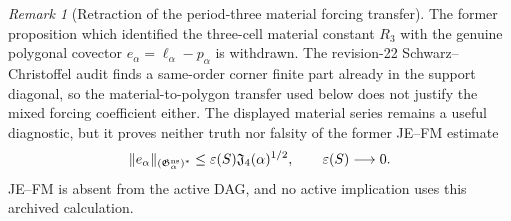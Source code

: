 \documentclass[11pt]{amsart}
\numberwithin{equation}{section}
\theoremstyle{definition}
\theoremstyle{remark}
\newtheorem{remark}[theorem]{Remark}
\newcommand{\Jfour}{\mathfrak J_4}
\begin{document}
\begin{remark}[Retraction of the period-three material forcing transfer]
\label{JP:rem:period-three-material-forcing}
The former proposition which identified the three-cell material constant
$R_3$ with the genuine polygonal covector
$e_\alpha=\ell_\alpha-p_\alpha$ is withdrawn.  The revision-22
Schwarz--Christoffel audit finds a same-order corner finite part already in
the support diagonal, so the material-to-polygon transfer used below does
not justify the mixed forcing coefficient either.  The displayed material
series remains a useful diagnostic, but it proves neither truth nor
falsity of the former JE--FM estimate
\begin{equation}\label{JP:eq:JE-FM}
 \|e_\alpha\|_{(\mathfrak G_\alpha^{\rm ns})^*}
 \le\varepsilon(S)\Jfour(\alpha)^{1/2},
 \qquad \varepsilon(S)\longrightarrow0.
\end{equation}
JE--FM is absent from the active
DAG, and no active implication uses this archived calculation.
\end{remark}
\end{document}
